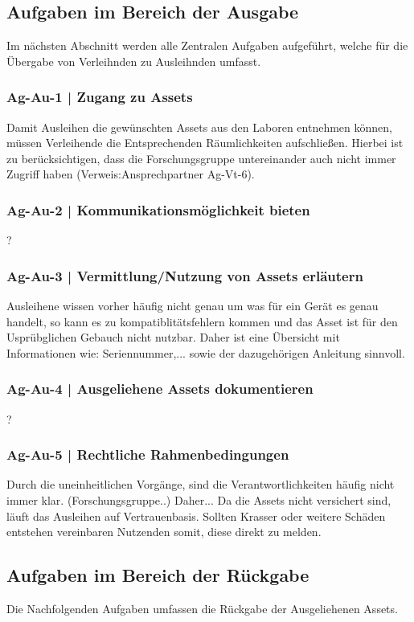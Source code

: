\subsection*{Aufgaben im Bereich der Ausgabe}
Im nächsten Abschnitt werden alle Zentralen Aufgaben aufgeführt, welche für die Übergabe von
Verleihnden zu Ausleihnden umfasst.
\subsubsection*{Ag-Au-1 | Zugang zu Assets}
Damit Ausleihen die gewünschten Assets aus den Laboren entnehmen können, müssen Verleihende
die Entsprechenden Räumlichkeiten aufschließen. Hierbei ist zu berücksichtigen, dass die
Forschungsgruppe untereinander auch nicht immer Zugriff haben (Verweis:Ansprechpartner Ag-Vt-6).
\subsubsection*{Ag-Au-2 | Kommunikationsmöglichkeit bieten}
?
\subsubsection*{Ag-Au-3 | Vermittlung/Nutzung von Assets erläutern}
Ausleihene wissen vorher häufig nicht genau um was für ein Gerät es genau handelt, so kann es zu
kompatiblitätsfehlern kommen und das Asset ist für den Usprübglichen Gebauch nicht nutzbar.
Daher ist eine Übersicht mit Informationen wie: Seriennummer,... sowie der dazugehörigen Anleitung sinnvoll.
\subsubsection*{Ag-Au-4 | Ausgeliehene Assets dokumentieren}
?
\subsubsection*{Ag-Au-5 | Rechtliche Rahmenbedingungen}
Durch die uneinheitlichen Vorgänge, sind die Verantwortlichkeiten häufig nicht immer klar. (Forschungsgruppe..)
Daher... 
Da die Assets nicht versichert sind, läuft das Ausleihen auf Vertrauenbasis. Sollten Krasser oder
weitere Schäden entstehen vereinbaren Nutzenden somit, diese direkt zu melden.

\subsection*{Aufgaben im Bereich der Rückgabe}
Die Nachfolgenden Aufgaben umfassen die Rückgabe der Ausgeliehenen Assets.

